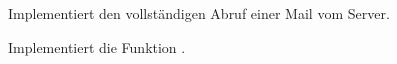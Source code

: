 \documentclass[9pt, a4paper]{arbeitsblatt}
\begin{document}
\begin{aufgabe}[icon=\iconPartner\,\iconComputer]
	Implementiert den vollständigen Abruf einer Mail vom Server.
\end{aufgabe}

\begin{aufgabe*}[icon=\iconPartner\,\iconComputer]
	Implementiert die Funktion .
\end{aufgabe*}
\end{document}
